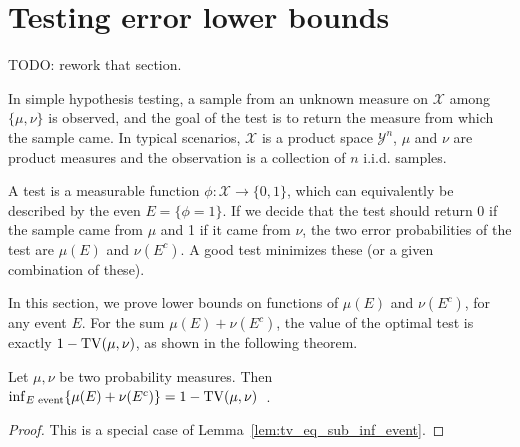 

\section{Testing error lower bounds}

TODO: rework that section.

In simple hypothesis testing, a sample from an unknown measure on $\mathcal X$ among $\{\mu, \nu\}$ is observed, and the goal of the test is to return the measure from which the sample came.
In typical scenarios, $\mathcal X$ is a product space $\mathcal Y^n$, $\mu$ and $\nu$ are product measures and the observation is a collection of $n$ i.i.d. samples.

A test is a measurable function $\phi : \mathcal X \to \{0,1\}$, which can equivalently be described by the even $E = \{\phi = 1\}$. If we decide that the test should return 0 if the sample came from $\mu$ and 1 if it came from $\nu$, the two error probabilities of the test are $\mu(E)$ and $\nu(E^c)$. A good test minimizes these (or a given combination of these).

In this section, we prove lower bounds on functions of $\mu(E)$ and $\nu(E^c)$, for any event $E$.
For the sum $\mu(E) + \nu(E^c)$, the value of the optimal test is exactly $1 - \operatorname{TV}(\mu, \nu)$, as shown in the following theorem.

\begin{theorem}
  \label{thm:testing_eq_tv}
  Let $\mu, \nu$ be two probability measures. Then $\inf_{E \text{ event}}\{\mu(E) + \nu(E^c)\} = 1 - \operatorname{TV}(\mu, \nu)$~.
\end{theorem}

\begin{proof}
This is a special case of Lemma~\ref{lem:tv_eq_sub_inf_event}.
\end{proof}

